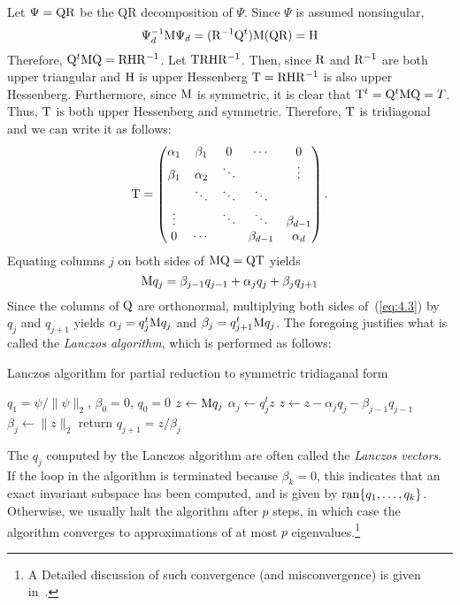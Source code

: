 Let $\Psi = \mathrm{Q}\mathrm{R}$ be the QR decomposition of $\Psi$. Since $\Psi$ is assumed nonsingular,
\[
\Psi_d^{-1}\mathrm{M} \Psi_d = (\mathrm{R}^{-1}\mathrm{Q}^t)\mathrm{M}(\mathrm{Q}\mathrm{R}) = \mathrm{H}
\]
Therefore, $\mathrm{Q}^t\mathrm{M}\mathrm{Q} = \mathrm{R}\mathrm{H}\mathrm{R}^{-1}$.  Let $\mathrm{T} \mathrm{R}\mathrm{H}\mathrm{R}^{-1}$.  Then, since $\mathrm{R}$
and $\mathrm{R}^{-1}$ are both upper triangular and $\mathrm{H}$ is upper Hessenberg $\mathrm{T} = \mathrm{R}\mathrm{H}\mathrm{R}^{-1}$ is also upper
Hessenberg. Furthermore, since $\mathrm{M}$ is symmetric, it is clear that 
$\mathrm{T}^t =\mathrm{Q}^t\mathrm{M}\mathrm{Q} = T$. Thus, $\mathrm{T}$ is both upper Hessenberg and symmetric. Therefore,
$\mathrm{T}$ is tridiagonal and we can write it as follows:
\begin{equation}
  \label{eq:4.2}
\mathrm{T} = 
\begin{pmatrix}
\alpha_1 & \beta_1 &      0 & \cdots & 0 \\
\beta_1  & \alpha_2 & \ddots &        & \vdots\\
         & \ddots & \ddots & \ddots   &\\
\vdots   &       &  \ddots & \ddots & \beta_{d-1}\\
0  &   \cdots    &   & \beta_{d-1} &\alpha_d
\end{pmatrix}.
\end{equation}
%
%
%
%
Equating columns $j$ on both sides of $\mathrm{M}\mathrm{Q} = \mathrm{Q}\mathrm{T}$ yields
\begin{equation}
\label{eq:4.3}
\mathrm{M} q_j = \beta_{j-1}q_{j-1}+\alpha_j q_j + \beta_j q_{j+1}
\end{equation}
Since the columns of $\mathrm{Q}$ are orthonormal, multiplying both sides 
of~(\ref{eq:4.3})
by $q_j$ and $q_{j+1}$ yields
$\alpha_j = q_j^t \mathrm{M} q_j$ and $\beta_j = q_{j+1}^t \mathrm{M} q_j$.
The foregoing justifies what is called the \emph{Lanczos algorithm}, which is performed as follows:
         \begin{algorithm}
           \caption{Lanczos algorithm for partial reduction to symmetric
             tridiaganal form}
           \begin{algorithmic}
             \STATE $q_1 = \psi/\|\psi\|_2$, $\beta_0 = 0$, $q_0= 0$
             \STATE $z \leftarrow \mathrm{M} q_j$
             \STATE $\alpha_j \leftarrow q_j^tz$
             \STATE $z \leftarrow z - \alpha_j q_j - \beta_{j-1} q_{j-1}$
             \STATE $\beta_j \leftarrow \|z\|_2$
             \STATE return
             \ENDIF
             \STATE $q_{j+1} = z/\beta_j$
             \ENDFOR
           \end{algorithmic}
         \end{algorithm}
The $q_j$ computed by the Lanczos algorithm are often called the \emph{Lanczos vectors}. If the
loop in the algorithm is terminated because $\beta_{k}= 0$, this indicates that
an exact invariant subspace has been computed, and is given by 
$\operatorname{ran}\{q_1, \dots, q_k\}$. Otherwise, we usually halt the algorithm after 
$p$ steps, in which case the algorithm converges to approximations of at most
  $p$ eigenvalues.\footnote{A Detailed discussion of such convergence (and
    misconvergence) is given in~\cite{Demmel:1997}.}

